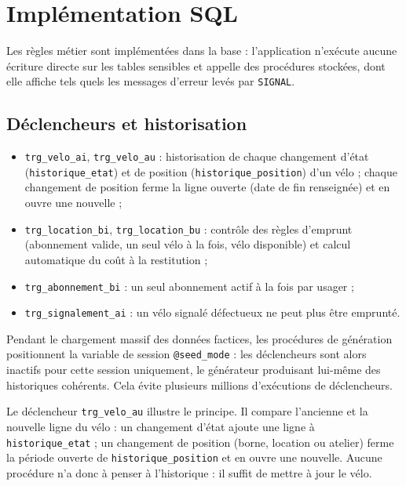\section{Implémentation SQL}\label{sec:implementation}

Les règles métier sont implémentées dans la base : l'application n'exécute aucune écriture directe sur les tables sensibles et appelle des procédures stockées, dont elle affiche tels quels les messages d'erreur levés par \texttt{SIGNAL}.

\subsection{Déclencheurs et historisation}

\begin{itemize}
	\item \texttt{trg\_velo\_ai}, \texttt{trg\_velo\_au} : historisation de chaque changement d'état (\texttt{historique\_etat}) et de position (\texttt{historique\_position}) d'un vélo ; chaque changement de position ferme la ligne ouverte (date de fin renseignée) et en ouvre une nouvelle ;
	\item \texttt{trg\_location\_bi}, \texttt{trg\_location\_bu} : contrôle des règles d'emprunt (abonnement valide, un seul vélo à la fois, vélo disponible) et calcul automatique du coût à la restitution ;
	\item \texttt{trg\_abonnement\_bi} : un seul abonnement actif à la fois par usager ;
	\item \texttt{trg\_signalement\_ai} : un vélo signalé défectueux ne peut plus être emprunté.
\end{itemize}

Pendant le chargement massif des données factices, les procédures de génération positionnent la variable de session \texttt{@seed\_mode} : les déclencheurs sont alors inactifs pour cette session uniquement, le générateur produisant lui-même des historiques cohérents. Cela évite plusieurs millions d'exécutions de déclencheurs.

Le déclencheur \texttt{trg\_velo\_au} illustre le principe. Il compare l'ancienne et la nouvelle ligne du vélo : un changement d'état ajoute une ligne à \texttt{historique\_etat} ; un changement de position (borne, location ou atelier) ferme la période ouverte de \texttt{historique\_position} et en ouvre une nouvelle. Aucune procédure n'a donc à penser à l'historique : il suffit de mettre à jour le vélo.

